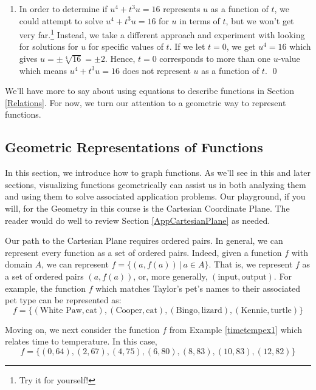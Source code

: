 \begin{ex}
\begin{enumerate}
\begin{enumerate}
\item  In order to determine if  $u^{4} + t^{3}u = 16$ represents $u$ as a function of $t$, we could attempt to solve $u^{4} + t^{3}u = 16$ for $u$ in terms of $t$, but we won't get very far.\footnote{Try it for yourself!}  Instead, we take a different approach and experiment with looking for solutions for $u$ for specific values of $t$.  If we let $t = 0$, we get $u^{4} = 16$ which gives $u = \pm \sqrt[4]{16} = \pm 2$.  Hence, $t = 0$ corresponds to more than one $u$-value which means  $u^{4}  +t^{3}u = 16$  does not represent $u$ as a function of $t$.  \qed

\end{enumerate}

\end{enumerate}

\end{ex}

We'll have more to say about using equations to describe functions in Section \ref{Relations}.  For now, we turn our attention to a geometric way to represent functions.

\subsection{Geometric Representations of Functions}

In this section, we introduce how to graph functions.  As we'll see in this and later sections, visualizing functions geometrically can assist us in both analyzing them and using them to solve associated application problems.  Our playground, if you will, for the Geometry in this course is the Cartesian Coordinate Plane.  The reader would do well to review Section \ref{AppCartesianPlane} as needed.

Our path to the Cartesian Plane requires ordered pairs.  In general, we can represent every function as a set of ordered pairs.  Indeed, given a function $f$ with domain $A$, we can represent $f = \{ (a, f(a)) \, | \, a \in A\}$.  That is, we represent $f$ as a set of ordered pairs $(a, f(a))$, or, more generally, $(\text{input}, \text{output})$.  For example, the function $f$ which matches Taylor's pet's names to their associated pet type can be represented as:
\[
f = \{ (\text{White Paw}, \text{cat}), (\text{Cooper}, \text{cat}), (\text{Bingo}, \text{lizard}), (\text{Kennie}, \text{turtle}) \}
\]

Moving on, we next  consider the function $f$ from Example \ref{timetempex1} which relates time to temperature. In this case,
\[
f = \{ (0, 64), (2, 67), (4, 75), (6, 80), (8, 83), (10, 83), (12, 82) \}
\]

